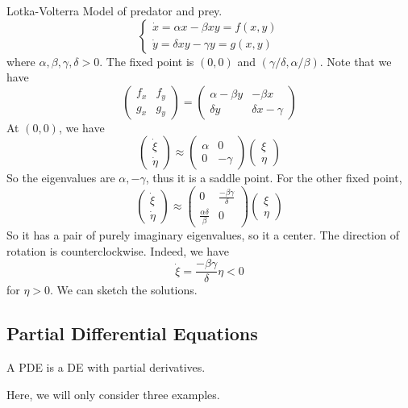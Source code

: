 \begin{example}
    Lotka-Volterra Model of predator and prey.
    $$\begin{cases}
        \dot{x}=\alpha x-\beta xy=f(x,y)\\
        \dot{y}=\delta xy-\gamma y=g(x,y)
    \end{cases}$$
    where $\alpha,\beta,\gamma,\delta>0$.
    The fixed point is $(0,0)$ and $(\gamma/\delta,\alpha/\beta)$.
    Note that we have
    $$\begin{pmatrix}
        f_x&f_y\\
        g_x&g_y
    \end{pmatrix}=\begin{pmatrix}
        \alpha-\beta y&-\beta x\\
        \delta y&\delta x-\gamma
    \end{pmatrix}$$
    At $(0,0)$, we have
    $$\begin{pmatrix}
        \dot{\xi}\\
        \dot{\eta}
    \end{pmatrix}\approx
    \begin{pmatrix}
        \alpha&0\\
        0&-\gamma
    \end{pmatrix}\begin{pmatrix}
        \xi\\
        \eta
    \end{pmatrix}$$
    So the eigenvalues are $\alpha,-\gamma$, thus it is a saddle point.
    For the other fixed point,
    $$\begin{pmatrix}
        \dot{\xi}\\
        \dot{\eta}
    \end{pmatrix}\approx
    \begin{pmatrix}
        0&\frac{-\beta\gamma}{\delta}\\
        \frac{\alpha\delta}{\beta}&0
    \end{pmatrix}\begin{pmatrix}
        \xi\\
        \eta
    \end{pmatrix}$$
    So it has a pair of purely imaginary eigenvalues, so it a center.
    The direction of rotation is counterclockwise.
    Indeed, we have
    $$\dot{\xi}=\frac{-\beta\gamma}{\delta}\eta<0$$
    for $\eta>0$.
    We can sketch the solutions.
\end{example}
\subsection{Partial Differential Equations}
\begin{definition}
    A PDE is a DE with partial derivatives.
\end{definition}
Here, we will only consider three examples.
